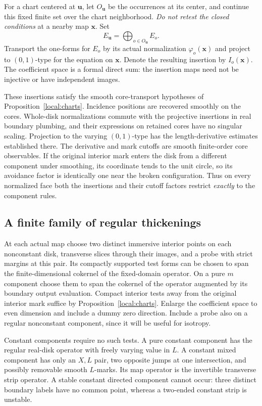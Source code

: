 \documentclass[11pt]{article}
\theoremstyle{definition}
\theoremstyle{remark}
\numberwithin{equation}{section}
\begin{document}
For a chart centered at $\mathbf u$, let $O_{\mathbf u}$ be the occurrences
at its center, and continue this fixed finite set over the chart
neighborhood.  \emph{Do not retest the closed conditions} at a nearby
map $\mathbf x$.  Set
\[
 E_{\mathbf u}=\bigoplus_{o\in O_{\mathbf u}}E_o.
\]
Transport the one-forms for $E_o$ by its actual normalization
$\varphi_o(\mathbf x)$ and project to $(0,1)$-type for the equation on
$\mathbf x$.  Denote the resulting insertion by $I_o(\mathbf x)$.
The coefficient space is a formal direct sum: the insertion maps need
not be injective or have independent images.

These insertions satisfy the smooth core-transport hypotheses of
Proposition~\ref{local:charts}.  Incidence positions are recovered smoothly on
the cores.  Whole-disk normalizations commute with the projective
insertions in real boundary plumbing, and their expressions on retained
cores have no singular scaling.  Projection to the varying $(0,1)$-type
has the length-derivative estimates established there.  The derivative
and mark cutoffs are smooth finite-order core observables.  If the
original interior mark enters the disk from a different component under
smoothing, its coordinate tends to the unit circle, so its avoidance
factor is identically one near the broken configuration.  Thus on every
normalized face both the insertions and their cutoff factors restrict
\emph{exactly} to the component rules.

\subsection{A finite family of regular thickenings}

At each actual map choose two distinct immersive interior points on each
nonconstant disk, transverse slices through their images, and a probe
with strict margins at this pair.  Its compactly supported test forms
can be chosen to span the finite-dimensional cokernel of the fixed-domain
operator.  On a pure $m$ component choose them to span the cokernel of
the operator augmented by its boundary output evaluation.  Compact
interior tests away from the original interior mark suffice by
Proposition~\ref{local:charts}.  Enlarge the coefficient space to even dimension
and include a dummy zero direction.  Include a probe also on a regular
nonconstant component, since it will be useful for isotropy.

Constant components require no such tests.  A pure constant component
has the regular real-disk operator with freely varying value in $L$.
A constant mixed component has only an $X,L$ pair, two opposite jumps
at one intersection, and possibly removable smooth $L$-marks.  Its
map operator is the invertible transverse strip operator.  A stable
constant directed component cannot occur: three distinct boundary labels
have no common point, whereas a two-ended constant strip is unstable.
\end{document}
